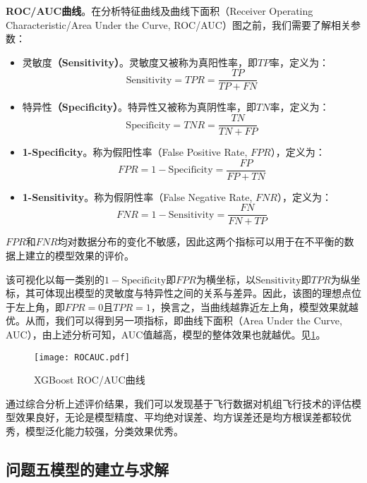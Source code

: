 \documentclass{MathorCupModeling}
\begin{document}
\textbf{ROC/AUC曲线}。在分析特征曲线及曲线下面积（Receiver Operating Characteristic/Area Under the Curve, ROC/AUC）图之前，我们需要了解相关参数：
		\begin{itemize}
			\item {\heiti 灵敏度}\textbf{（Sensitivity）}。灵敏度又被称为真阳性率，即$TP$率，定义为：
			\begin{equation}
				\mathrm{Sensitivity}=TPR=\frac{TP}{TP+FN} \label{Sensitivity}
			\end{equation}
			\item {\heiti 特异性}\textbf{（Specificity）}。特异性又被称为真阴性率，即$TN$率，定义为：
			\begin{equation}
				\mathrm{Specificity}=TNR=\frac{TN}{TN+FP} \label{Specificity}
			\end{equation}
			\item \textbf{1-Specificity}。称为假阳性率（False Positive Rate, $FPR$），定义为：
			\begin{equation}
				FPR=1-\mathrm{Specificity}=\frac{FP}{FP+TN} \label{FPR}
			\end{equation}
			\item \textbf{1-Sensitivity}。称为假阴性率（False Negative Rate, $FNR$），定义为：
			\begin{equation}
				FNR=1-\mathrm{Sensitivity}=\frac{FN}{FN+TP} \label{FNR}
			\end{equation}
		\end{itemize}
		$FPR$和$FNR$均对数据分布的变化不敏感\textcolor{blue}{\cite{Paper:ROCAUC}}，因此这两个指标可以用于在不平衡的数据上建立的模型效果的评价。
		
该可视化以每一类别的$1-\mathrm{Specificity}$即$FPR$为横坐标，以$\mathrm{Sensitivity}$即$TPR$为纵坐标，其可体现出模型的灵敏度与特异性之间的关系与差异。因此，该图的理想点位于左上角，即$FPR=0$且$TPR=1$，换言之，当曲线越靠近左上角，模型效果就越优。从而，我们可以得到另一项指标，即曲线下面积（Area Under the Curve, AUC），由上述分析可知，AUC值越高，模型的整体效果也就越优。见\textcolor{blue}{\cref{fig:ROCAUC}}。
		\begin{figure}[H]
			\centering
			\texttt{[image: ROCAUC.pdf]}
			\caption{XGBoost ROC/AUC曲线}
			\label{fig:ROCAUC}
		\end{figure}

通过综合分析上述评价结果，我们可以发现基于飞行数据对机组飞行技术的评估模型效果良好，无论是模型精度、平均绝对误差、均方误差还是均方根误差都较优秀，模型泛化能力较强，分类效果优秀。
  
	\subsection{问题五模型的建立与求解}
\end{document}
